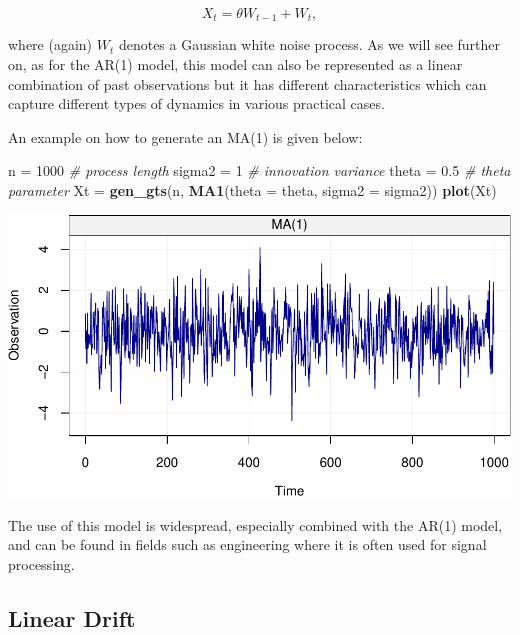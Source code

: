 \documentclass[]{book}
\newenvironment{Shaded}{\begin{snugshade}}{\end{snugshade}}
\newcommand{\KeywordTok}[1]{\textcolor[rgb]{0.13,0.29,0.53}{\textbf{#1}}}
\newcommand{\DataTypeTok}[1]{\textcolor[rgb]{0.13,0.29,0.53}{#1}}
\newcommand{\DecValTok}[1]{\textcolor[rgb]{0.00,0.00,0.81}{#1}}
\newcommand{\FloatTok}[1]{\textcolor[rgb]{0.00,0.00,0.81}{#1}}
\newcommand{\StringTok}[1]{\textcolor[rgb]{0.31,0.60,0.02}{#1}}
\newcommand{\CommentTok}[1]{\textcolor[rgb]{0.56,0.35,0.01}{\textit{#1}}}
\newcommand{\NormalTok}[1]{#1}
\theoremstyle{definition}
\theoremstyle{definition}
\theoremstyle{definition}
\theoremstyle{remark}
\begin{document}
\begin{equation} 
  X_t = \theta W_{t-1} + W_t,
\end{equation}

where (again) \(W_t\) denotes a Gaussian white noise process. As we will
see further on, as for the AR(1) model, this model can also be
represented as a linear combination of past observations but it has
different characteristics which can capture different types of dynamics
in various practical cases.

An example on how to generate an MA(1) is given below:

\begin{Shaded}
\begin{Highlighting}[]
\NormalTok{n =}\StringTok{ }\DecValTok{1000}                              \CommentTok{# process length}
\NormalTok{sigma2 =}\StringTok{ }\DecValTok{1}                            \CommentTok{# innovation variance}
\NormalTok{theta =}\StringTok{ }\FloatTok{0.5}                           \CommentTok{# theta parameter}
\NormalTok{Xt =}\StringTok{ }\KeywordTok{gen_gts}\NormalTok{(n, }\KeywordTok{MA1}\NormalTok{(}\DataTypeTok{theta =}\NormalTok{ theta, }\DataTypeTok{sigma2 =}\NormalTok{ sigma2))}
\KeywordTok{plot}\NormalTok{(Xt)}
\end{Highlighting}
\end{Shaded}

\includegraphics{ts_files/figure-latex/example_MA1-1.pdf}

The use of this model is widespread, especially combined with the AR(1)
model, and can be found in fields such as engineering where it is often
used for signal processing.

\subsection{Linear Drift}\label{drift}
\end{document}
